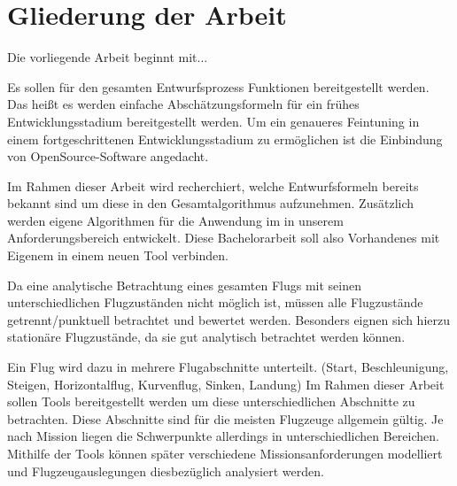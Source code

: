 \section{Gliederung der Arbeit}
\label{sec:gliederung}
Die vorliegende Arbeit beginnt mit...

Es sollen für den gesamten Entwurfsprozess Funktionen bereitgestellt werden. Das heißt es werden einfache Abschätzungsformeln für ein frühes Entwicklungsstadium bereitgestellt werden. Um ein genaueres Feintuning in einem fortgeschrittenen Entwicklungsstadium zu ermöglichen ist die Einbindung von OpenSource-Software angedacht.

Im Rahmen dieser Arbeit wird recherchiert, welche Entwurfsformeln bereits bekannt sind um diese in den Gesamtalgorithmus aufzunehmen. Zusätzlich werden eigene Algorithmen für die Anwendung im in unserem Anforderungsbereich entwickelt. Diese Bachelorarbeit soll also Vorhandenes mit Eigenem in einem neuen Tool verbinden.

Da eine analytische Betrachtung eines gesamten Flugs mit seinen unterschiedlichen Flugzuständen nicht möglich ist, müssen alle Flugzustände getrennt/punktuell betrachtet und bewertet werden. Besonders eignen sich hierzu stationäre Flugzustände, da sie gut analytisch betrachtet werden können.

Ein Flug wird dazu in mehrere Flugabschnitte unterteilt. (Start, Beschleunigung, Steigen, Horizontalflug, Kurvenflug, Sinken, Landung) Im Rahmen dieser Arbeit sollen Tools bereitgestellt werden um diese unterschiedlichen Abschnitte zu betrachten. Diese Abschnitte sind für die meisten Flugzeuge allgemein gültig. Je nach Mission liegen die Schwerpunkte allerdings in unterschiedlichen Bereichen. Mithilfe der Tools können später verschiedene Missionsanforderungen modelliert und Flugzeugauslegungen diesbezüglich analysiert werden.